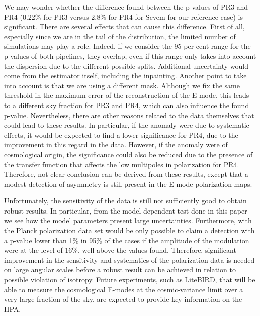 We may wonder whether the difference found between the p-values of PR3 and PR4 (0.22\% for PR3 versus 2.8\% for PR4 for Sevem for our reference case) is significant. There are several effects that can cause this difference. First of all, especially since we are in the tail of the distribution, the limited number of simulations may play a role. Indeed, if we consider the 95 per cent range for the p-values of both pipelines, they overlap, even if this range only takes into account the dispersion due to the different possible splits. Additional uncertainty would come from the estimator itself, including the inpainting. Another point to take into account is that we are using a different mask. Although we fix the same threshold in the maximum error of the reconstruction of the E-mode, this leads to a different sky fraction for PR3 and PR4, which can also influence the found p-value. Nevertheless, there are other reasons related to the data themselves that could lead to these results. In particular, if the anomaly were due to systematic effects, it would be expected to find a lower significance for PR4, due to the improvement in this regard in the data. However, if the anomaly were of cosmological origin, the significance could also be reduced due to the presence of the transfer function that affects the low multipoles in polarization for PR4. Therefore, not clear conclusion can be derived from these results, except that a modest detection of asymmetry is still present in the E-mode polarization maps.

Unfortunately, the sensitivity of the data is still not sufficiently good to obtain robust results. In particular, from the model-dependent test done in this paper we see how the model parameters present large uncertainties. Furthermore, with the Planck polarization data set would be only possible to claim a detection with a p-value lower than 1\% in 95\% of the cases if the amplitude of the modulation were at the level of 16\%, well above the values found. Therefore, significant improvement in the sensitivity and systematics of the polarization data is needed on large angular scales before a robust result can be achieved in relation to possible violation of isotropy. Future experiments, such as LiteBIRD, that will be able to measure the cosmological E-modes at the cosmic-variance limit over 
a very large fraction of the sky, are expected to provide key information on the HPA.
